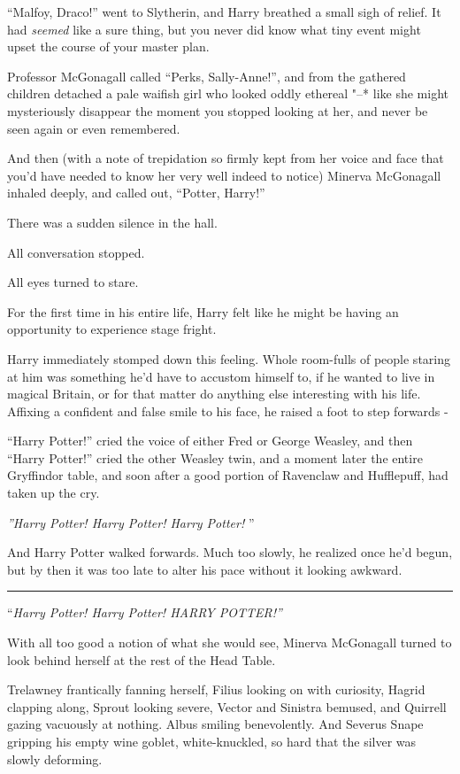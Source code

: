 ``Malfoy, Draco!'' went to Slytherin, and Harry breathed a small sigh of
relief. It had \emph{seemed} like a sure thing, but you never did know
what tiny event might upset the course of your master plan.

Professor McGonagall called ``Perks, Sally-Anne!'', and from the
gathered children detached a pale waifish girl who looked oddly ethereal
"--* like she might mysteriously disappear the moment you stopped looking
at her, and never be seen again or even remembered.

And then (with a note of trepidation so firmly kept from her voice and
face that you'd have needed to know her very well indeed to notice)
Minerva McGonagall inhaled deeply, and called out, ``Potter, Harry!''

There was a sudden silence in the hall.

All conversation stopped.

All eyes turned to stare.

For the first time in his entire life, Harry felt like he might be
having an opportunity to experience stage fright.

Harry immediately stomped down this feeling. Whole room-fulls of people
staring at him was something he'd have to accustom himself to, if he
wanted to live in magical Britain, or for that matter do anything else
interesting with his life. Affixing a confident and false smile to his
face, he raised a foot to step forwards -

``Harry Potter!'' cried the voice of either Fred or George Weasley, and
then ``Harry Potter!'' cried the other Weasley twin, and a moment later
the entire Gryffindor table, and soon after a good portion of Ravenclaw
and Hufflepuff, had taken up the cry.

\emph{''Harry Potter! Harry Potter! Harry Potter!} ''

And Harry Potter walked forwards. Much too slowly, he realized once he'd
begun, but by then it was too late to alter his pace without it looking
awkward.

\begin{center}\rule{3in}{0.4pt}\end{center}

``\emph{Harry Potter! Harry Potter! HARRY POTTER!''}

With all too good a notion of what she would see, Minerva McGonagall
turned to look behind herself at the rest of the Head Table.

Trelawney frantically fanning herself, Filius looking on with curiosity,
Hagrid clapping along, Sprout looking severe, Vector and Sinistra
bemused, and Quirrell gazing vacuously at nothing. Albus smiling
benevolently. And Severus Snape gripping his empty wine goblet,
white-knuckled, so hard that the silver was slowly deforming.

